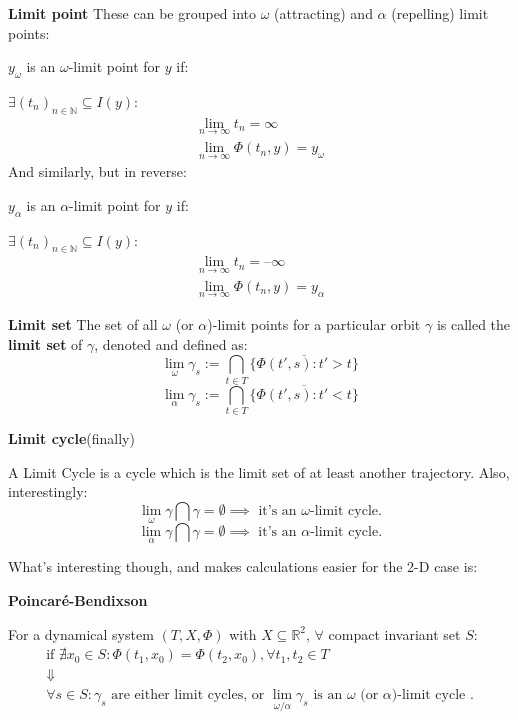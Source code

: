 \begin{definition}\textbf{Limit point}
	These can be grouped into $\omega$ (attracting) and $\alpha$ (repelling) limit points:

	$y_\omega$ is an $\omega$-limit point  for $y$ if:

	$\exists (t_n)_{n \in \mathbb{N}} \subseteq I(y) : $
	\begin{gather*}
		\lim_{n \rightarrow \infty} t_n = \infty  \\
		\lim_{n \rightarrow \infty} \Phi(t_n,y) = y_\omega
	\end{gather*}
	And similarly, but in reverse:

	$y_\alpha$ is an $\alpha$-limit point  for $y$ if:

	$\exists (t_n)_{n \in \mathbb{N}} \subseteq I(y) : $
	\begin{gather*}
		\lim_{n \rightarrow \infty} t_n = \textbf{--} \infty  \\
		\lim_{n \rightarrow \infty} \Phi(t_n,y) = y_\alpha
	\end{gather*}
\end{definition}

\begin{definition}\textbf{Limit set}
	The set of all $\omega$ (or $\alpha$)-limit points for a particular orbit $\gamma$ is called the \textbf{limit set} of $\gamma$, denoted and defined as:
	\[
		\lim_{\omega}\gamma_s := \bigcap_{t \in T} \overline{ \{ \Phi(t', s) : t' > t \} }
	\]
	\[
		\lim_{\alpha}\gamma_s := \bigcap_{t \in T} \overline{ \{ \Phi(t', s) : t' < t \} }
	\]
\end{definition}

\begin{definition} \textbf{Limit cycle}(finally)

	A Limit Cycle is a cycle which is the limit set of at least another trajectory.
	Also, interestingly:
	\[
		\lim_{\omega}\gamma \bigcap \gamma  = \emptyset \implies \text{ it's an } \omega \text{-limit cycle}.
	\]
	\[
		\lim_{\alpha}\gamma \bigcap \gamma  = \emptyset \implies \text{ it's an } \alpha \text{-limit cycle}.
	\]
\end{definition}

What's interesting though, and makes calculations easier for the 2-D case is:
\begin{theorem}  \textbf{Poincaré-Bendixson}

	For a dynamical system $(T,X,\Phi)$ with $X \subseteq \mathbb{R}^2$, $\forall$ compact invariant set $S$:
	\begin{gather*}
		\text{if } \nexists x_0 \in S : \Phi(t_1, x_0) = \Phi(t_2,x_0), \forall t_1,t_2 \in T \\
		\Downarrow \\
		\forall s \in S: \gamma_s \text{ are either limit cycles, or } \lim_{\omega / \alpha}\gamma_s \text{ is an $\omega$ (or $\alpha$)-limit cycle }.
	\end{gather*}
\end{theorem}

